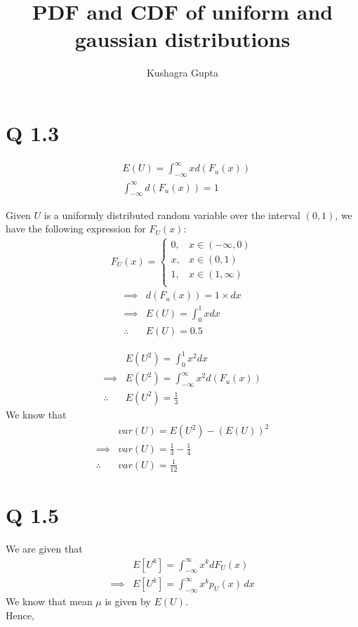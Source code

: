 \documentclass[journal,12pt,twocolumn]{article}
\title{PDF and CDF of uniform and gaussian distributions}
\author{Kushagra Gupta}
\date{}
\begin{document}
\maketitle

\section{Q 1.3}
\begin{align}
    &E(U) = \int _ {- \infty} ^ {\infty} {x d(F_u(x))} \\
    &\int _ {- \infty} ^ {\infty} { d(F_u(x))} = 1
\end{align}

\noindent Given $U$ is a uniformly distributed random variable over the interval $(0, 1)$, we have the following expression for $F_U(x)$:
\begin{align}
    F_U(x) =
	    \begin{cases}
	    	0, & x \in (-\infty, 0) \\
  	    	x, & x \in (0, 1) \\
    		1, & x \in (1, \infty)\\
    	    \end{cases}
\end{align}
\begin{align}
    \implies &d(F_u(x)) = 1 \times dx\\
    \implies &E(U) = \int _ {0} ^ {1} {x dx}\\
    \therefore &E(U) = 0.5
\end{align}

\begin{align}
        &E(U^2) = \int _ {0} ^ {1} {x^2 dx} \\
    \implies &E(U^2) = \int _ {- \infty} ^ {\infty} {x^2 d(F_u(x))} \\
        \therefore &E(U^2) = \frac{1}{3}
\end{align}
We know that
\begin{align}
    &var(U) = E(U^2) - (E(U))^2 \\
   \implies&var(U) = \frac{1}{3} - \frac{1}{4} \\
    \therefore &var(U) = \frac{1}{12}
\end{align}

\section {Q 1.5}
We are given that
\begin{align}
            &E[U^k] = \int^{\infty}_{-\infty} x^k dF_U(x)\\
    \implies&E[U^k] = \int^{\infty}_{-\infty} x^k p_U(x) \,dx		\label{eq: Expected}
\end{align}
We know that mean $\mu$ is given by $E(U)$.\\ Hence,
\end{document}
